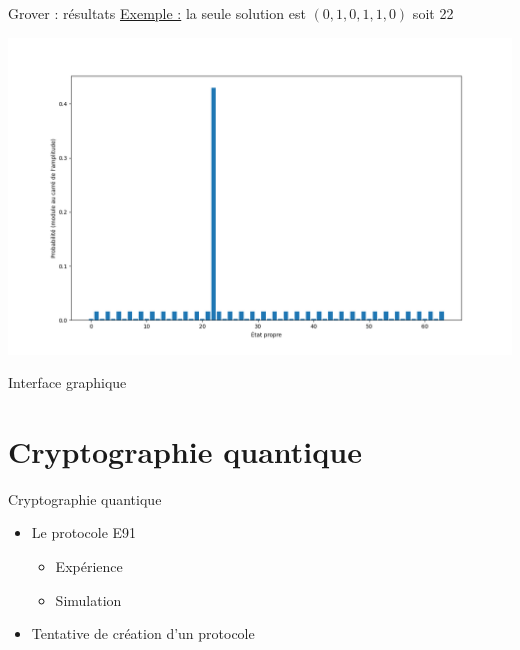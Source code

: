 \documentclass[french]{beamer}
\begin{document}
\begin{frame}{Grover : résultats}
    \underline{Exemple :} la seule solution est $(0, 1, 0, 1, 1, 0)$ soit 22
    \begin{center}
        \includegraphics[scale=0.3]{Grover.png}
    \end{center}
\end{frame}

\begin{frame}{Interface graphique}
\end{frame}

\section{Cryptographie quantique}

\begin{frame}{Cryptographie quantique}
\begin{itemize}
    \item<1-> Le protocole E91
    \begin{itemize}
        \item Expérience
        \item Simulation
    \end{itemize}
    \item<2-> Tentative de création d'un protocole
\end{itemize}
\end{frame}
\end{document}
